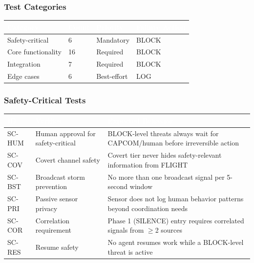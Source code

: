 \documentclass[11pt,letterpaper]{article}
\newcommand{\tableheader}[1]{\textbf{\sffamily\textcolor{white}{#1}}}
\begin{document}
\subsubsection{Test Categories}

\begin{center}
\begin{tabularx}{\textwidth}{L{3cm}C{1.5cm}C{2cm}C{2cm}}
\toprule
{}
\tableheader{Category} & \tableheader{Count} & \tableheader{Priority} & \tableheader{Failure Action} \\
\midrule
Safety-critical & 6 & Mandatory & BLOCK \\
Core functionality & 16 & Required & BLOCK \\
Integration & 7 & Required & BLOCK \\
Edge cases & 6 & Best-effort & LOG \\
\bottomrule
\end{tabularx}
\end{center}

\subsubsection{Safety-Critical Tests}

\begin{center}
\begin{tabularx}{\textwidth}{C{1.2cm}L{3.5cm}X}
\toprule
{}
\tableheader{ID} & \tableheader{Verifies} & \tableheader{Expected Behavior} \\
\midrule
SC-HUM & Human approval for safety-critical & BLOCK-level threats always wait for CAPCOM/human before irreversible action \\
SC-COV & Covert channel safety & Covert tier never hides safety-relevant information from FLIGHT \\
SC-BST & Broadcast storm prevention & No more than one broadcast signal per 5-second window \\
SC-PRI & Passive sensor privacy & Sensor does not log human behavior patterns beyond coordination needs \\
SC-COR & Correlation requirement & Phase 1 (SILENCE) entry requires correlated signals from $\geq$2 sources \\
SC-RES & Resume safety & No agent resumes work while a BLOCK-level threat is active \\
\bottomrule
\end{tabularx}
\end{center}
\end{document}
